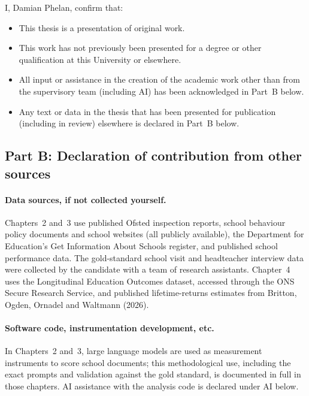 \documentclass[12pt, a4paper]{report}
\begin{document}
I, Damian Phelan, confirm that:
\begin{itemize}
  \item This thesis is a presentation of original work.
  \item This work has not previously been presented for a degree or
        other qualification at this University or elsewhere.
  \item All input or assistance in the creation of the academic work
        other than from the supervisory team (including AI) has been
        acknowledged in Part~B below.
  \item Any text or data in the thesis that has been presented for
        publication (including in review) elsewhere is declared in
        Part~B below.
\end{itemize}

\subsection*{Part B: Declaration of contribution from other sources}

\paragraph{Data sources, if not collected yourself.}
Chapters~2 and~3 use published Ofsted inspection reports, school
behaviour policy documents and school websites (all publicly
available), the Department for Education's Get Information About
Schools register, and published school performance data. The
gold-standard school visit and headteacher interview data were
collected by the candidate with a team of research assistants. Chapter~4 uses the Longitudinal Education
Outcomes dataset, accessed through the ONS Secure Research Service,
and published lifetime-returns estimates from Britton, Ogden, Ornadel
and Waltmann (2026).

\paragraph{Software code, instrumentation development, etc.}
In Chapters~2 and~3, large language models are used as measurement
instruments to score school documents; this methodological use,
including the exact prompts and validation against the gold standard,
is documented in full in those chapters. AI assistance with the
analysis code is declared under AI below.
\end{document}
